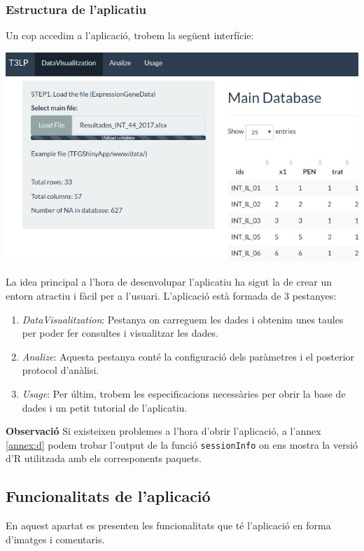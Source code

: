 \documentclass[english]{article}
\begin{document}
\subsubsection{Estructura de l'aplicatiu}
Un cop accedim a l'aplicació, trobem la següent interfície:
\begin{center}
\includegraphics[scale=0.3]{app1.png}
\end{center}

La idea principal a l'hora de desenvolupar l'aplicatiu ha sigut la de crear un entorn atractiu i fàcil per a l'usuari. L'aplicació està formada de 3 pestanyes:
\begin{enumerate}
\item \textit{DataVisualitzation}: Pestanya on carreguem les dades i obtenim unes taules per poder fer consultes i visualitzar les dades.
\item \textit{Analize}: Aquesta pestanya conté la configuració dels paràmetres i el posterior protocol d'anàlisi.
\item \textit{Usage}: Per últim, trobem les especificacions necessàries per obrir la base de dades i un petit tutorial de l'aplicatiu.
\end{enumerate}

\textbf{Observació}  Si existeixen problemes a l'hora d'obrir l'aplicació, a l'annex \ref{annex:d} podem trobar l'output de la funció \texttt{sessionInfo} on ens mostra la versió d'R utilitzada amb els corresponents paquets.
\clearpage
\subsection{Funcionalitats de l'aplicació}
En aquest apartat es presenten les funcionalitats que té l'aplicació en forma d'imatges i comentaris.
\\
\end{document}
